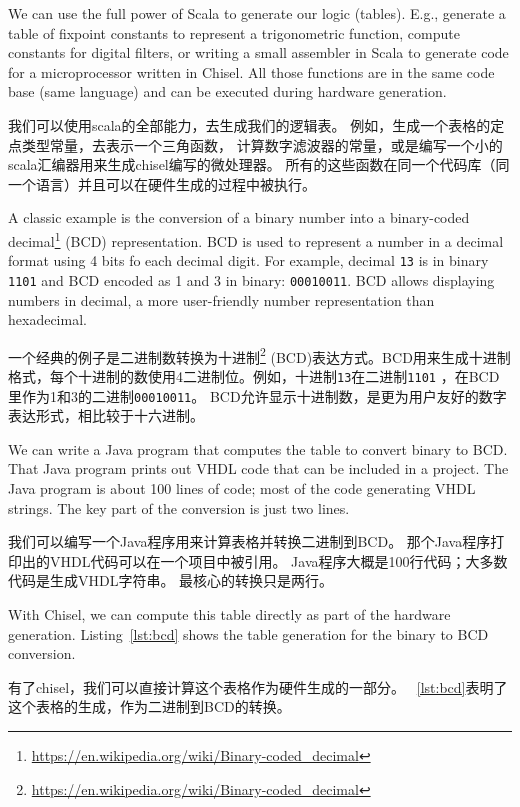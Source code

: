 \documentclass[%
    10pt,
    headinclude, footexclude,
    openright, %
    notitlepage,
    cleardoubleempty,
    headsepline,
    pointlessnumbers,
    bibtotoc, idxtotoc,
    ]{scrbook}
\newcommand{\code}[1]{{\small{\texttt{#1}}}}
\newcommand{\myref}[2]{\href{#1}{#2}}
\renewcommand{\myref}[2]{{#2}{\footnote{\url{#1}}}}
\begin{document}

We can use the full power of Scala to generate our logic (tables).
E.g., generate a table of fixpoint constants to represent a trigonometric function,
compute constants for digital filters, or writing a small assembler in Scala
to generate code for a microprocessor written in Chisel. All those functions
are in the same code base (same language) and can be executed during
hardware generation.

我们可以使用scala的全部能力，去生成我们的逻辑表。
例如，生成一个表格的定点类型常量，去表示一个三角函数，
计算数字滤波器的常量，或是编写一个小的scala汇编器用来生成chisel编写的微处理器。
所有的这些函数在同一个代码库（同一个语言）并且可以在硬件生成的过程中被执行。

A classic example is the conversion of a binary number
into a \myref{https://en.wikipedia.org/wiki/Binary-coded_decimal}{binary-coded decimal}
(BCD) representation. BCD is used to represent a number in a decimal
format using 4 bits fo each decimal digit. For example, decimal \code{13} is in binary
\code{1101} and BCD encoded as 1 and 3 in binary: \code{00010011}.
BCD allows displaying numbers in decimal, a more user-friendly number
representation than hexadecimal.

一个经典的例子是二进制数转换为\myref{https://en.wikipedia.org/wiki/Binary-coded_decimal}{十进制}
(BCD)表达方式。BCD用来生成十进制格式，每个十进制的数使用4二进制位。例如，十进制\code{13}在二进制\code{1101}
，在BCD里作为1和3的二进制\code{00010011}。
BCD允许显示十进制数，是更为用户友好的数字表达形式，相比较于十六进制。

We can write a Java program that computes the table to convert binary to BCD.
That Java program prints out VHDL code that can be included in a project.
The Java program is about 100 lines of code; most of the code generating
VHDL strings. The key part of the conversion is just two lines.

我们可以编写一个Java程序用来计算表格并转换二进制到BCD。
那个Java程序打印出的VHDL代码可以在一个项目中被引用。
Java程序大概是100行代码；大多数代码是生成VHDL字符串。
最核心的转换只是两行。

With Chisel, we can compute this table directly as part of the hardware generation.
Listing~\ref{lst:bcd} shows the table generation for the binary to BCD conversion.

有了chisel，我们可以直接计算这个表格作为硬件生成的一部分。
~\ref{lst:bcd}表明了这个表格的生成，作为二进制到BCD的转换。
\end{document}
